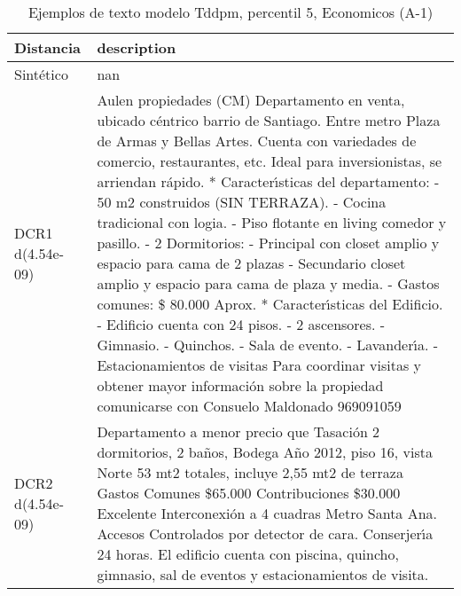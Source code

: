 \begin{table}[H]
\centering
\fontsize{10}{14}\selectfont
\caption{Ejemplos de texto modelo Tddpm, percentil 5, Economicos (A-1)}
\label{table-example-economicos-a-1-tddpm_mlp-5p-text}
\begin{tabular}{|l|m{35em}|}
\hline
\rowcolor[gray]{0.8}
Distancia & description \\
\hline Sintético & nan \\
\hline DCR1 d(4.54e-09) & Aulen propiedades (CM)  Departamento en venta, ubicado c\'entrico barrio de Santiago. Entre metro Plaza de Armas y Bellas Artes. Cuenta con variedades de comercio, restaurantes, etc. Ideal para inversionistas, se arriendan r\'apido.  * Caracter{\'\i}sticas del departamento:  - 50 m2 construidos (SIN TERRAZA). - Cocina tradicional con logia. - Piso flotante en living comedor y pasillo. - 2 Dormitorios: - Principal con closet amplio y espacio para cama de 2 plazas - Secundario closet amplio y espacio para cama de plaza y media. - Gastos comunes: \$ 80.000 Aprox.  * Caracter{\'\i}sticas del Edificio. - Edificio cuenta con 24 pisos. - 2 ascensores. - Gimnasio. - Quinchos. - Sala de evento. - Lavander{\'\i}a. - Estacionamientos de visitas  Para coordinar visitas y obtener mayor informaci\'on sobre la propiedad comunicarse con Consuelo Maldonado 969091059 \\
\hline DCR2 d(4.54e-09) & Departamento a menor precio que Tasaci\'on 2 dormitorios, 2 ba\~nos, Bodega A\~no 2012, piso 16, vista Norte 53 mt2 totales, incluye 2,55 mt2 de terraza Gastos Comunes \$65.000 Contribuciones \$30.000 Excelente Interconexi\'on a 4 cuadras Metro Santa Ana. Accesos Controlados por detector de cara. Conserjer{\'\i}a 24 horas. El edificio cuenta con piscina, quincho, gimnasio, sal de eventos y estacionamientos de visita. \\
\hline
\end{tabular}
\end{table}
